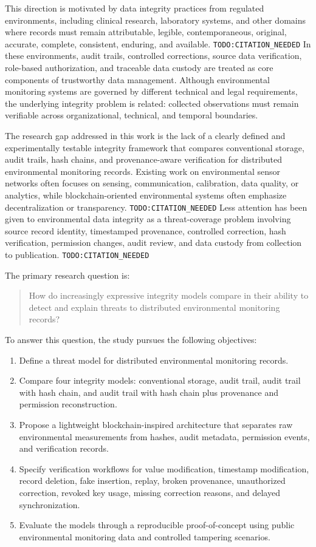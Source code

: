 This direction is motivated by data integrity practices from regulated environments, including clinical research, laboratory systems, and other domains where records must remain attributable, legible, contemporaneous, original, accurate, complete, consistent, enduring, and available. \texttt{TODO:CITATION\_NEEDED} In these environments, audit trails, controlled corrections, source data verification, role-based authorization, and traceable data custody are treated as core components of trustworthy data management. Although environmental monitoring systems are governed by different technical and legal requirements, the underlying integrity problem is related: collected observations must remain verifiable across organizational, technical, and temporal boundaries.

The research gap addressed in this work is the lack of a clearly defined and experimentally testable integrity framework that compares conventional storage, audit trails, hash chains, and provenance-aware verification for distributed environmental monitoring records. Existing work on environmental sensor networks often focuses on sensing, communication, calibration, data quality, or analytics, while blockchain-oriented environmental systems often emphasize decentralization or transparency. \texttt{TODO:CITATION\_NEEDED} Less attention has been given to environmental data integrity as a threat-coverage problem involving source record identity, timestamped provenance, controlled correction, hash verification, permission changes, audit review, and data custody from collection to publication. \texttt{TODO:CITATION\_NEEDED}

The primary research question is:

\begin{quote}
How do increasingly expressive integrity models compare in their ability to detect and explain threats to distributed environmental monitoring records?
\end{quote}

To answer this question, the study pursues the following objectives:

\begin{enumerate}
    \item Define a threat model for distributed environmental monitoring records.
    \item Compare four integrity models: conventional storage, audit trail, audit trail with hash chain, and audit trail with hash chain plus provenance and permission reconstruction.
    \item Propose a lightweight blockchain-inspired architecture that separates raw environmental measurements from hashes, audit metadata, permission events, and verification records.
    \item Specify verification workflows for value modification, timestamp modification, record deletion, fake insertion, replay, broken provenance, unauthorized correction, revoked key usage, missing correction reasons, and delayed synchronization.
    \item Evaluate the models through a reproducible proof-of-concept using public environmental monitoring data and controlled tampering scenarios.
\end{enumerate}

